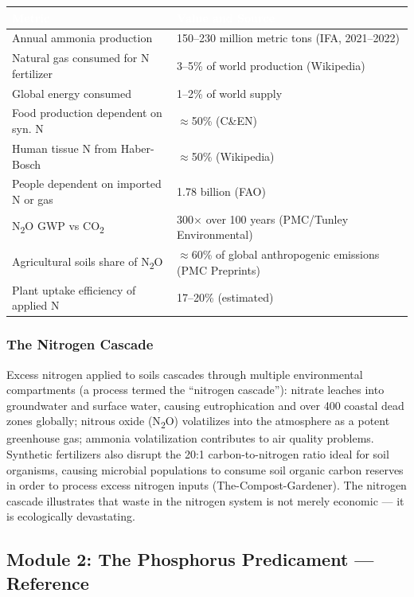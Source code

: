 \documentclass[11pt,letterpaper]{article}
\newcommand{\tableheader}[1]{\textbf{\sffamily\textcolor{white}{#1}}}
\begin{document}
\begin{center}
\begin{tabularx}{\textwidth}{L{4.5cm}X}
\toprule
{}
\tableheader{Metric} & \tableheader{Value and Source} \\
\midrule
Annual ammonia production & 150--230 million metric tons (IFA, 2021--2022) \\
Natural gas consumed for N fertilizer & 3--5\% of world production (Wikipedia) \\
Global energy consumed & 1--2\% of world supply \\
Food production dependent on syn. N & $\approx$50\% (C\&EN) \\
Human tissue N from Haber-Bosch & $\approx$50\% (Wikipedia) \\
People dependent on imported N or gas & 1.78 billion (FAO) \\
N\textsubscript{2}O GWP vs CO\textsubscript{2} & 300$\times$ over 100 years (PMC/Tunley Environmental) \\
Agricultural soils share of N\textsubscript{2}O & $\approx$60\% of global anthropogenic emissions (PMC Preprints) \\
Plant uptake efficiency of applied N & 17--20\% (estimated) \\
\bottomrule
\end{tabularx}
\end{center}

\subsubsection{The Nitrogen Cascade}

Excess nitrogen applied to soils cascades through multiple environmental compartments (a process termed the ``nitrogen cascade''): nitrate leaches into groundwater and surface water, causing eutrophication and over 400 coastal dead zones globally; nitrous oxide (N\textsubscript{2}O) volatilizes into the atmosphere as a potent greenhouse gas; ammonia volatilization contributes to air quality problems. Synthetic fertilizers also disrupt the 20:1 carbon-to-nitrogen ratio ideal for soil organisms, causing microbial populations to consume soil organic carbon reserves in order to process excess nitrogen inputs (The-Compost-Gardener). The nitrogen cascade illustrates that waste in the nitrogen system is not merely economic --- it is ecologically devastating.

\subsection{Module 2: The Phosphorus Predicament --- Reference}
\end{document}

